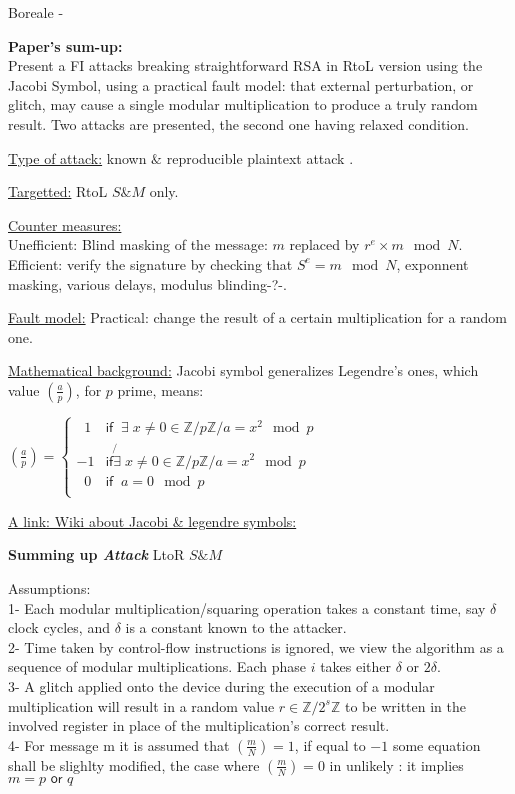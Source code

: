 \item Boreale - 

\textbf{Paper's sum-up:}\\
Present a FI attacks breaking straightforward RSA in RtoL version using the Jacobi Symbol, using
a practical fault model: that external perturbation, or glitch, may cause a single modular 
multiplication to produce a truly random result. Two attacks are presented, the second one having relaxed condition.

\underline{Type of attack:}
known $\&$ reproducible plaintext attack .

\underline{Targetted:} RtoL $S\&M$ only.

\underline{Counter measures:}\\
Unefficient: Blind masking of the message: $m$ replaced by $r^e \times m \mod N$.\\
Efficient: verify the signature by checking that $S^e = m \mod N$, exponnent masking,
various delays, modulus blinding-?-.

\underline{Fault model:}
Practical: change the result of a certain multiplication for a random one.

\underline{Mathematical background:}
Jacobi symbol generalizes Legendre's ones, which value 
$\left( \frac{a}{p} \right)$, for $p$ prime, means:
\begin{center}
$
\left( \frac{a}{p} \right) = \left\{
    \begin{array}{ll}
      \;\; 1 & \textsf{if} \;\;\exists \; x \neq 0 \in \mathbb{Z}/{p\mathbb{Z}}  / a = x^2 \mod p\\
      -1     & \textsf{if} \not{\exists} \; x \neq 0 \in \mathbb{Z}/{p\mathbb{Z}}  / a = x^2 \mod p\\
       \;\;0 & \textsf{if} \;\;a = 0 \mod p\\
    \end{array}
\right.
$
\end{center}


\href{http://en.wikipedia.org/wiki/Jacobi_symbol}{ A link: Wiki about Jacobi \& legendre symbols: }

\textbf{Summing up \textit{Attack}} LtoR $S\&M$
		
Assumptions:\\
1- Each modular multiplication/squaring operation takes a constant time, 
say $\delta$ clock cycles, and $\delta$ is a constant known to the attacker.\\
2- Time taken by control-flow instructions is ignored, we view the
algorithm as a sequence of modular multiplications. 
Each phase $i$ takes either $\delta$ or $2\delta$.\\
3- A glitch applied onto the device during the execution of a modular multiplication
will result in a random value $r\in \mathbb{Z}/{2^s\mathbb{Z}}$ to be written in 
the involved register in place of the multiplication's correct result.\\
4- For message m it is assumed that $\left( \frac{m}{N} \right)=1$, 
if equal to $-1$ some equation shall be slighlty modified, the case where 
$\left( \frac{m}{N} \right)=0$ in unlikely : it implies $m=p  \textsf{ or } q$

